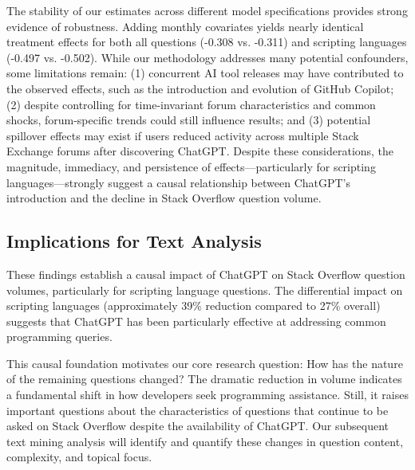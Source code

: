 The stability of our estimates across different model specifications provides strong evidence of robustness. Adding monthly covariates yields nearly identical treatment effects for both all questions (-0.308 vs. -0.311) and scripting languages (-0.497 vs. -0.502). While our methodology addresses many potential confounders, some limitations remain: (1) concurrent AI tool releases may have contributed to the observed effects, such as the introduction and evolution of GitHub Copilot; (2) despite controlling for time-invariant forum characteristics and common shocks, forum-specific trends could still influence results; and (3) potential spillover effects may exist if users reduced activity across multiple Stack Exchange forums after discovering ChatGPT. Despite these considerations, the magnitude, immediacy, and persistence of effects—particularly for scripting languages—strongly suggest a causal relationship between ChatGPT's introduction and the decline in Stack Overflow question volume.


\subsection{Implications for Text Analysis}

These findings establish a causal impact of ChatGPT on Stack Overflow question volumes, particularly for scripting language questions. The differential impact on scripting languages (approximately 39\% reduction compared to 27\% overall) suggests that ChatGPT has been particularly effective at addressing common programming queries.

This causal foundation motivates our core research question: How has the nature of the remaining questions changed? The dramatic reduction in volume indicates a fundamental shift in how developers seek programming assistance. Still, it raises important questions about the characteristics of questions that continue to be asked on Stack Overflow despite the availability of ChatGPT. Our subsequent text mining analysis will identify and quantify these changes in question content, complexity, and topical focus.